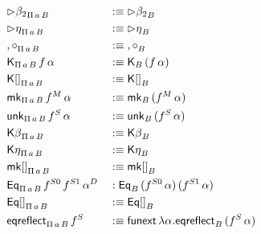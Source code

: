 \documentclass[acmsmall,review,anonymous]{acmart}\settopmatter{printfolios=true,printccs=false,printacmref=false}
\begin{document}
{\begin{alignat*}{5}
  & {\rhd\beta_2}_{\Pi\,a\,B}  && :\equiv {\rhd\beta_2}_B \\
  & {\rhd\eta}_{\Pi\,a\,B}  && :\equiv {\rhd\eta}_B \\
  & {,\circ}_{\Pi\,a\,B}  && :\equiv {,\circ}_B \\
  & \mathsf{K}_{\Pi\,a\,B}\,f\,\alpha  && :\equiv \mathsf{K}_B\,(f\,\alpha) \\
  & {\mathsf{K}[]}_{\Pi\,a\,B}  && :\equiv {\mathsf{K}[]}_B \\
  & \mathsf{mk}_{\Pi\,a\,B}\,f^M\,\alpha && :\equiv \mathsf{mk}_B\,(f^M\,\alpha)\\
  & \mathsf{unk}_{\Pi\,a\,B}\,f^S\,\alpha  && :\equiv \mathsf{unk}_B\,(f^S\,\alpha) \\
  & {\mathsf{K}\beta}_{\Pi\,a\,B}  && :\equiv {\mathsf{K}\beta}_B \\
  & {\mathsf{K}\eta}_{\Pi\,a\,B}  && :\equiv {\mathsf{K}\eta}_B \\
  & {\mathsf{mk}[]}_{\Pi\,a\,B}  && :\equiv {\mathsf{mk}[]}_B \\
  & \mathsf{Eq}_{\Pi\,a\,B}\,f^{S0}\,f^{S1}\,\alpha^D  && : \mathsf{Eq}_B\,(f^{S0}\,\alpha)\,(f^{S1}\,\alpha) \\
  & {\mathsf{Eq}[]}_{\Pi\,a\,B} && :\equiv {\mathsf{Eq}[]}_B \\
  & \mathsf{eqreflect}_{\Pi\,a\,B}\,f^S && :\equiv \mathsf{funext}\,\lambda\alpha.\mathsf{eqreflect}_B\,(f^S\,\alpha)
\end{alignat*}
}
\end{document}
